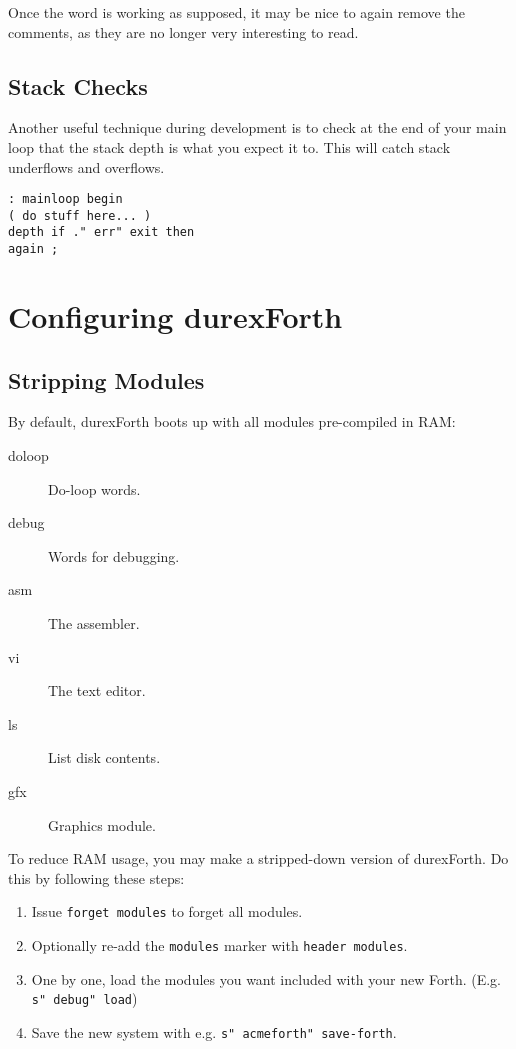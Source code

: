 Once the word is working as supposed, it may be nice to again remove the comments, as
they are no longer very interesting to read.

\subsection{Stack Checks}

Another useful technique during development is to check at the end of your main loop
that the stack depth is what you expect it to. This will catch stack underflows
and overflows.

\begin{verbatim}
: mainloop begin
( do stuff here... )
depth if ." err" exit then
again ;
\end{verbatim}

\section{Configuring durexForth}

\subsection{Stripping Modules}

By default, durexForth boots up with all modules pre-compiled in RAM:

\begin{description}
\item[doloop] Do-loop words.
\item[debug] Words for debugging.
\item[asm] The assembler.
\item[vi] The text editor.
\item[ls] List disk contents.
\item[gfx] Graphics module.
\end{description}

To reduce RAM usage, you may make a stripped-down version of durexForth. Do this by following these steps:

\begin{enumerate}
\item Issue \texttt{forget modules} to forget all modules.
\item Optionally re-add the \texttt{modules} marker with \texttt{header modules}.
\item One by one, load the modules you want included with your new Forth. (E.g. \texttt{s" debug" load})
\item Save the new system with e.g. \texttt{s" acmeforth" save-forth}.
\end{enumerate}

